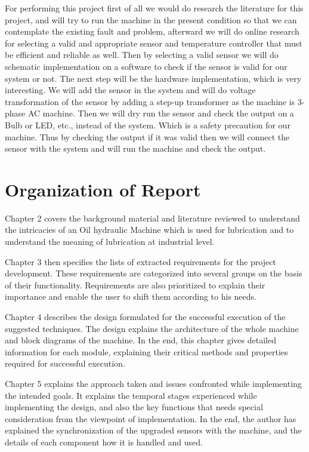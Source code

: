 \documentclass[14pt]{report}
\begin{document}
For performing this project ﬁrst of all we would do research the literature for this project, and will
try to run the machine in the present condition so that we can contemplate the existing fault and
problem, afterward we will do online research for selecting a valid and appropriate sensor and temperature
controller that must be eﬃcient and reliable as well. Then by selecting a valid sensor we will do schematic
implementation on a software to check if the sensor is valid for our system or not. The next step will be
the hardware implementation, which is very interesting. We will add the sensor in the system and will
do voltage transformation of the sensor by adding a step-up transformer as the machine is 3-phase AC
machine. Then we will dry run the sensor and check the output on a Bulb or LED, etc., instead of the
system. Which is a safety precaution for our machine. Thus by checking the output if it was valid then
we will connect the sensor with the system and will run the machine and check the output.

\section{\textbf{Organization of Report}}

Chapter 2 covers the background material and literature reviewed to understand the intricacies of an
Oil hydraulic Machine which is used for lubrication and to understand the meaning of lubrication at
industrial level. 

Chapter 3 then speciﬁes the lists of extracted requirements for the project development.
These requirements are categorized into several groups on the basis of their functionality. Requirements
are also prioritized to explain their importance and enable the user to shift them according to his needs.

Chapter 4 describes the design formulated for the successful execution of the suggested techniques.
The design explains the architecture of the whole machine and block diagrams of the machine. In the end,
this chapter gives detailed information for each module, explaining their critical methods and properties
required for successful execution.

Chapter 5 explains the approach taken and issues confronted while implementing the intended goals.
It explains the temporal stages experienced while implementing the design, and also the key functions that
needs special consideration from the viewpoint of implementation. In the end, the author has explained
the synchronization of the upgraded sensors with the machine, and the details of each component how it
is handled and used.
\end{document}
